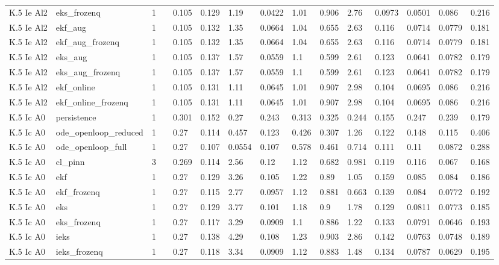 \begin{table}[t]
\begin{tabular}{lllllllllllllll}
K.5 Ie Al2 & eks\_frozenq & 1 &  & 0.105 & 0.129 & 1.19 & 0.0422 & 1.01 & 0.906 & 2.76 & 0.0973 & 0.0501 & 0.086 & 0.216 \\
K.5 Ie Al2 & ekf\_aug & 1 &  & 0.105 & 0.132 & 1.35 & 0.0664 & 1.04 & 0.655 & 2.63 & 0.116 & 0.0714 & 0.0779 & 0.181 \\
K.5 Ie Al2 & ekf\_aug\_frozenq & 1 &  & 0.105 & 0.132 & 1.35 & 0.0664 & 1.04 & 0.655 & 2.63 & 0.116 & 0.0714 & 0.0779 & 0.181 \\
K.5 Ie Al2 & eks\_aug & 1 &  & 0.105 & 0.137 & 1.57 & 0.0559 & 1.1 & 0.599 & 2.61 & 0.123 & 0.0641 & 0.0782 & 0.179 \\
K.5 Ie Al2 & eks\_aug\_frozenq & 1 &  & 0.105 & 0.137 & 1.57 & 0.0559 & 1.1 & 0.599 & 2.61 & 0.123 & 0.0641 & 0.0782 & 0.179 \\
K.5 Ie Al2 & ekf\_online & 1 &  & 0.105 & 0.131 & 1.11 & 0.0645 & 1.01 & 0.907 & 2.98 & 0.104 & 0.0695 & 0.086 & 0.216 \\
K.5 Ie Al2 & ekf\_online\_frozenq & 1 &  & 0.105 & 0.131 & 1.11 & 0.0645 & 1.01 & 0.907 & 2.98 & 0.104 & 0.0695 & 0.086 & 0.216 \\
K.5 Ic A0 & persistence & 1 &  & 0.301 & 0.152 & 0.27 & 0.243 & 0.313 & 0.325 & 0.244 & 0.155 & 0.247 & 0.239 & 0.179 \\
K.5 Ic A0 & ode\_openloop\_reduced & 1 &  & 0.27 & 0.114 & 0.457 & 0.123 & 0.426 & 0.307 & 1.26 & 0.122 & 0.148 & 0.115 & 0.406 \\
K.5 Ic A0 & ode\_openloop\_full & 1 &  & 0.27 & 0.107 & 0.0554 & 0.107 & 0.578 & 0.461 & 0.714 & 0.111 & 0.11 & 0.0872 & 0.288 \\
K.5 Ic A0 & cl\_pinn & 3 &  & 0.269 & 0.114 & 2.56 & 0.12 & 1.12 & 0.682 & 0.981 & 0.119 & 0.116 & 0.067 & 0.168 \\
K.5 Ic A0 & ekf & 1 &  & 0.27 & 0.129 & 3.26 & 0.105 & 1.22 & 0.89 & 1.05 & 0.159 & 0.085 & 0.084 & 0.186 \\
K.5 Ic A0 & ekf\_frozenq & 1 &  & 0.27 & 0.115 & 2.77 & 0.0957 & 1.12 & 0.881 & 0.663 & 0.139 & 0.084 & 0.0772 & 0.192 \\
K.5 Ic A0 & eks & 1 &  & 0.27 & 0.129 & 3.77 & 0.101 & 1.18 & 0.9 & 1.78 & 0.129 & 0.0811 & 0.0773 & 0.185 \\
K.5 Ic A0 & eks\_frozenq & 1 &  & 0.27 & 0.117 & 3.29 & 0.0909 & 1.1 & 0.886 & 1.22 & 0.133 & 0.0791 & 0.0646 & 0.193 \\
K.5 Ic A0 & ieks & 1 &  & 0.27 & 0.138 & 4.29 & 0.108 & 1.23 & 0.903 & 2.86 & 0.142 & 0.0763 & 0.0748 & 0.189 \\
K.5 Ic A0 & ieks\_frozenq & 1 &  & 0.27 & 0.118 & 3.34 & 0.0909 & 1.12 & 0.883 & 1.48 & 0.134 & 0.0787 & 0.0629 & 0.195 \\

\end{tabular}
\end{table}
